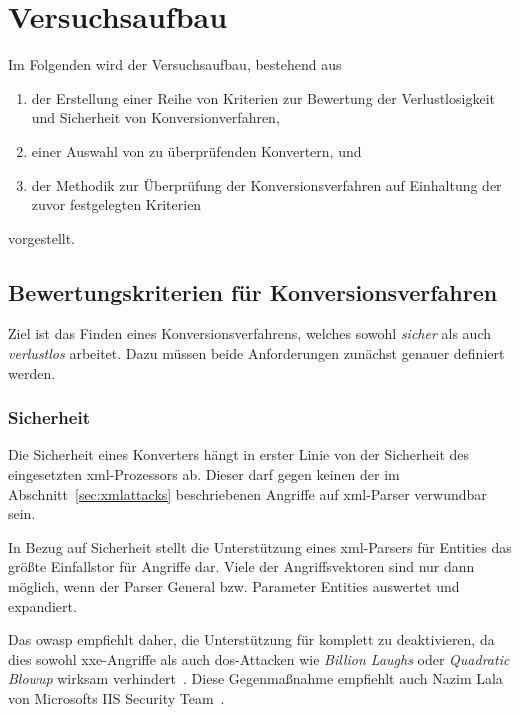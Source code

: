 \chapter{Versuchsaufbau}
\label{chap:impl}

\begin{samepage}
Im Folgenden wird der Versuchsaufbau, bestehend aus
\begin{enumerate}
    \item{} der Erstellung einer Reihe von Kriterien zur Bewertung der Verlustlosigkeit und Sicherheit von Konversionverfahren,
    \item{} einer Auswahl von zu überprüfenden Konvertern, und
    \item{} der Methodik zur Überprüfung der Konversionsverfahren auf Einhaltung der zuvor festgelegten Kriterien
\end{enumerate}
vorgestellt.
\end{samepage}

\section{Bewertungskriterien für Konversionsverfahren}
\label{sec:criteria}

Ziel ist das Finden eines Konversionsverfahrens, welches sowohl \emph{sicher} als auch \emph{verlustlos} arbeitet. Dazu müssen beide Anforderungen zunächst genauer definiert werden.

\subsection{Sicherheit}
\label{sec:criteria-security}

Die Sicherheit eines Konverters hängt in erster Linie von der Sicherheit des eingesetzten \acrshort{xml}-Prozessors ab. Dieser darf gegen keinen der im Abschnitt~\ref{sec:xmlattacks} beschriebenen Angriffe auf \acrshort{xml}-Parser verwundbar sein.

In Bezug auf Sicherheit stellt die Unterstützung eines \acrshort{xml}-Parsers für Entities das größte Einfallstor für Angriffe dar. Viele der Angriffsvektoren sind nur dann möglich, wenn der Parser General bzw. Parameter Entities auswertet und expandiert.

Das \acrfull{owasp} empfiehlt daher, die Unterstützung für  komplett zu deaktivieren, da dies sowohl \acrshort{xxe}-Angriffe als auch \acrshort{dos}-Attacken wie \emph{Billion Laughs} oder \emph{Quadratic Blowup} wirksam verhindert~\cite[Abschn.~1.1]{owasp2017xxeprevention}. Diese Gegenmaßnahme empfiehlt auch Nazim Lala von Microsofts IIS Security Team~\cite{lala2013handlinguntrustedxml}.

